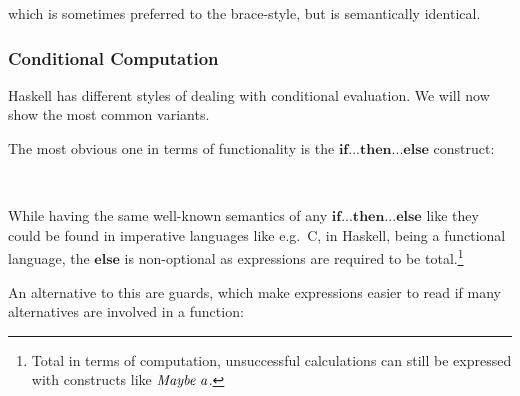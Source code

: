 \documentclass[paper=A4,twoside=true,openright,parskip=full,chapterprefix=true,headings=normal,bibliography=totoc,listof=totoc,titlepage=on,captions=tableabove,draft=false,british]{scrreprt}%
\begin{document}
which is sometimes preferred to the brace-style, but is semantically
identical.

\hypertarget{conditional-computation}{%
\subsubsection{Conditional Computation}\label{conditional-computation}}

Haskell has different styles of dealing with conditional evaluation. We
will now show the most common variants.

The most obvious one in terms of functionality is the
\ensuremath{\mathbf{if}\mathbin{...}\mathbf{then}\mathbin{...}\mathbf{else}} construct:


\begin{hscode}\SaveRestoreHook
{}%
%
\>[B]{}\mathbin{::}\to {}\<[E]%
\\
\>[B]{}\;\mathrel{=}\;\mathbin{<}\;\;\mathbin{*}\;\;\mathbin{*}\<[E]%
\ColumnHook
\end{hscode}\resethooks
\vspace{-2\baselineskip}

While having the same well-known semantics of any \ensuremath{\mathbf{if}\mathbin{...}\mathbf{then}\mathbin{...}\mathbf{else}}
like they could be found in imperative languages like e.g.~C, in
Haskell, being a functional language, the \ensuremath{\mathbf{else}} is non-optional as
expressions are required to be total.\footnote{Total in terms of
  computation, unsuccessful calculations can still be expressed with
  constructs like \ensuremath{\Conid{Maybe}\;\Varid{a}}.}

An alternative to this are guards, which make expressions easier to read
if many alternatives are involved in a function:
\end{document}
